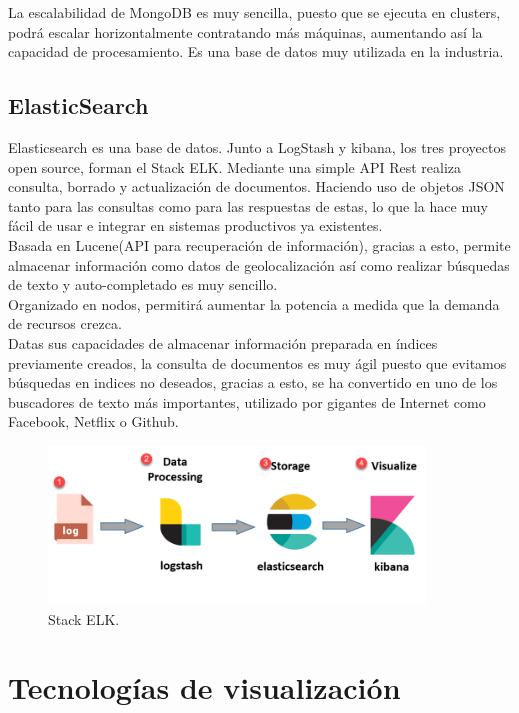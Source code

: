 \documentclass[11pt,a4paper]{book}
\begin{document}
				La escalabilidad de MongoDB es muy sencilla, puesto que se ejecuta en clusters, podrá escalar horizontalmente contratando más máquinas, aumentando así la capacidad de procesamiento. Es una base de datos muy utilizada en la industria.
			\subsection{ElasticSearch}
				Elasticsearch es una base de datos. Junto a LogStash y kibana, los tres proyectos open source, forman el Stack ELK. Mediante una simple API Rest realiza consulta, borrado y actualización de documentos. Haciendo uso de objetos JSON tanto para las consultas como para las respuestas de estas, lo que la hace muy fácil de usar e integrar en sistemas productivos ya existentes.\\
				
				Basada en Lucene(API para recuperación de información), gracias a esto, permite almacenar información como datos de geolocalización así como realizar búsquedas de texto y auto-completado es muy sencillo.\\
		
				Organizado en nodos, permitirá aumentar la potencia a medida que la demanda de recursos crezca.\\
				
				Datas sus capacidades de almacenar información preparada en índices previamente creados, la consulta de documentos es muy ágil puesto que evitamos búsquedas en indices no deseados, gracias a esto, se ha convertido en uno de los buscadores de texto más importantes, utilizado por gigantes de Internet como Facebook, Netflix o Github.

			\begin{figure}[H]
				\centering
				\includegraphics[width=10cm, keepaspectratio]{img/ELK_Stack.png}
				\caption{Stack ELK.}
				\label{fig:MTV_Django}
			\end{figure}
		
		\section{Tecnologías de visualización}
\end{document}
